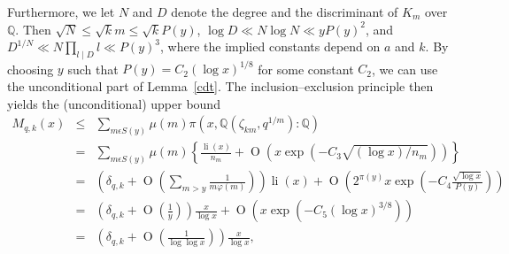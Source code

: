 \documentclass[twoside,final,reqno,noamsfonts]{birkartspecial}
\begin{document}
Furthermore, we let $N$ and $D$ denote the degree and the discriminant of $K_m$ over $\mathbb Q$.
Then $\sqrt{N}\leq \sqrt{k} m\le \sqrt k P(y)$, $\log D\ll N\log N\ll y P(y)^2$,
and $D^{1/N}\ll N\prod_{l \mid D}l\ll P(y)^3 $,
where the implied constants depend on $a$ and $k$.
By choosing $y$ such that $P(y)=C_2(\log x)^{1/8}$ for some constant $C_2$,
we can use the unconditional part of Lemma~\ref{cdt}.
The inclusion--exclusion principle then yields
the (unconditional) upper bound
\begin{eqnarray}\nonumber
M_{q,k}(x)   & \leq &\sum_{m \epsilon S (y)}
\mu(m)\pi(x,{\mathbb Q}(\zeta_{km},q^{1/m})\colon{\mathbb Q})\nonumber\\
& = &\sum_{m \epsilon S (y)}\nonumber
\mu(m)\left\{\frac{\operatorname{li}(x)}{n_m}+\operatorname{O}\left(x\exp( -C_3\sqrt{(\log x)/n_m})\right)\right\}\\
&  = & \left(\delta_{q,k}+ \operatorname{O}{\left(\displaystyle{\sum_{m>y}\frac{1}{m\varphi(m)}}\right)}
\right)\operatorname{li}(x)+\operatorname{O}{\left(2^{\pi(y)}x\exp\left({-C_4\frac{\sqrt{\log x}}{P(y)}}\right)\right)}\nonumber\\
&  = & \left(\delta_{q,k}+ \operatorname{O}{\left(\frac{1}{y}\right)}
\right)\frac{x}{\log x}+\operatorname{O}{\left(x\exp\left(-C_5(\log x)^{3/8}\right)\right)}\nonumber\\
& =  &\left(\delta_{q,k}+ \operatorname{O}{\left(\frac{1}{\log\log x}\right)}
\right)\frac{x}{\log x},
\nonumber
\end{eqnarray}
\end{document}
